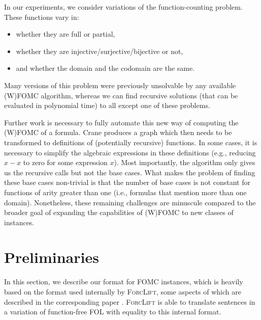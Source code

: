 
In our experiments, we consider variations of the function-counting problem.
These functions vary in:
\begin{itemize}
  \item whether they are full or partial,
  \item whether they are injective/surjective/bijective or not,
  \item and whether the domain and the codomain are the same.
\end{itemize}
Many versions of this problem were previously unsolvable by any available
(W)FOMC algorithm, whereas we can find recursive solutions (that can be
evaluated in polynomial time) to all except one of these problems.


Further work is necessary to fully automate this new way of computing the
(W)FOMC of a formula. Crane produces a graph which then needs to be transformed
to definitions of (potentially recursive) functions. In some cases, it is
necessary to simplify the algebraic expressions in these definitions (e.g.,
reducing $x-x$ to zero for some expression $x$). Most importantly, the algorithm
only gives us the recursive calls but not the base cases. What makes the problem
of finding these base cases non-trivial is that the number of base cases is not
constant for functions of arity greater than one (i.e., formulas that mention
more than one domain). Nonetheless, these remaining challenges are minuscule
compared to the broader goal of expanding the capabilities of (W)FOMC to new
classes of instances.


\section{Preliminaries}

In this section, we describe our format for FOMC instances, which is heavily
based on the format used internally by \textsc{ForcLift}, some aspects of which
are described in the corresponding paper \citep{DBLP:conf/ijcai/BroeckTMDR11}.
\textsc{ForcLift} is able to translate sentences in a variation of function-free
FOL with equality to this internal format.

